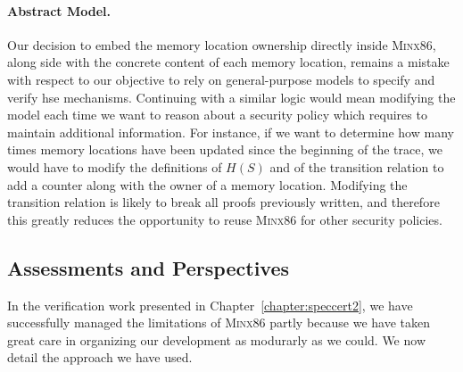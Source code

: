 \paragraph{Abstract Model.}
%
Our decision to embed the memory location ownership directly inside {\scshape
  Minx86}, along side with the concrete content of each memory location, remains
a mistake  with respect to our objective to rely on general-purpose models to
specify and verify \ac{hse} mechanisms.
%
Continuing with a similar logic would mean modifying the model each time we want
to reason about a security policy which requires to maintain additional information.
%
For instance, if we want to determine how many times memory locations have been
updated since the beginning of the trace, we would have to modify the
definitions of \( H(S) \) and of the transition relation to add a counter along
with the owner of a memory location.
%
Modifying the transition relation is likely to break all proofs previously
written, and therefore this greatly reduces the opportunity to reuse {\scshape
  Minx86} for other security policies.
%


\subsection{Assessments and Perspectives}
\label{subsec:freespec:approachoverview}

In the verification work presented in Chapter~\ref{chapter:speccert2}, we have
successfully managed the limitations of {\scshape Minx86} partly because we have
taken great care in organizing our development as modurarly as we could.
%
We now detail the approach we have used. 


